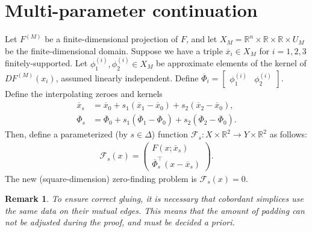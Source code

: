 \documentclass[10pt]{article}
\newcommand{\R}{\mathbb{R}}
\newtheorem{remark}[rem]{Remark}
\begin{document}
\section{Multi-parameter continuation}
Let $F^{(M)}$ be a finite-dimensional projection of $F$, and let $X_M=\R^n\times\R\times\R\times U_M$ be the finite-dimensional domain. Suppose we have a triple $\overline x_i\in X_M$ for $i=1,2,3$ finitely-supported. Let $\phi^{(i)}_1,\phi^{(i)}_2\in X_M$ be approximate elements of the kernel of $DF^{(M)}(x_i)$, assumed linearly independent. Define $\overline\Phi_i=[\begin{array}{cc}\phi^{(i)}_1&\phi^{(i)}_2\end{array}]$. Define the interpolating zeroes and kernels
\begin{align*}
\overline x_s&=\overline x_0 + s_1(\overline x_1-\overline x_0) + s_2(\overline x_2-\overline x_0),\\
\overline\Phi_s&=\overline\Phi_0 + s_1(\overline\Phi_1-\overline\Phi_0) + s_2(\overline\Phi_2 - \overline\Phi_0).
\end{align*}
Then, define a parameterized (by $s\in\Delta$) function $\mathcal{F}_s:X\times\R^2\rightarrow Y\times\R^2$ as follows:
\begin{align*}
\mathcal{F}_s(x)=\left(\begin{array}{c}F(x;\overline x_s) \\ \overline\Phi_s^\intercal(x-\overline x_s)\end{array}\right).
\end{align*}
The new (square-dimension) zero-finding problem is $\mathcal{F}_s(x)=0$.

\begin{remark}
To ensure correct gluing, it is necessary that cobordant simplices use the same data on their mutual edges. This means that the amount of padding can not be adjusted during the proof, and must be decided a priori.
\end{remark}
\end{document}
